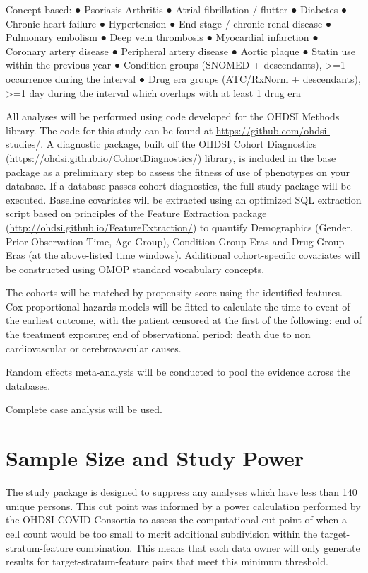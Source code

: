\documentclass[
  12pt,
]{article}
\begin{document}
Concept-based:
● Psoriasis Arthritis
● Atrial fibrillation / flutter
● Diabetes
● Chronic heart failure
● Hypertension
● End stage / chronic renal disease
● Pulmonary embolism
● Deep vein thrombosis
● Myocardial infarction
● Coronary artery disease
● Peripheral artery disease
● Aortic plaque
● Statin use within the previous year
● Condition groups (SNOMED + descendants), \textgreater=1 occurrence during the interval
● Drug era groups (ATC/RxNorm + descendants), \textgreater=1 day during the interval which overlaps with at least 1 drug era

All analyses will be performed using code developed for the OHDSI Methods library. The code for this study can be found at \url{https://github.com/ohdsi-studies/}. A diagnostic package, built off the OHDSI Cohort Diagnostics (\url{https://ohdsi.github.io/CohortDiagnostics/}) library, is included in the base package as a preliminary step to assess the fitness of use of phenotypes on your database. If a database passes cohort diagnostics, the full study package will be executed. Baseline covariates will be extracted using an optimized SQL extraction script based on principles of the Feature Extraction package (\url{http://ohdsi.github.io/FeatureExtraction/}) to quantify Demographics (Gender, Prior Observation Time, Age Group), Condition Group Eras and Drug Group Eras (at the above-listed time windows). Additional cohort-specific covariates will be constructed using OMOP standard vocabulary concepts.

The cohorts will be matched by propensity score using the identified features. Cox proportional hazards models will be fitted to calculate the time-to-event of the earliest outcome, with the patient censored at the first of the following: end of the treatment exposure; end of observational period; death due to non cardiovascular or cerebrovascular causes.

Random effects meta-analysis will be conducted to pool the evidence across the databases.

Complete case analysis will be used.

\hypertarget{sample-size}{%
\section{Sample Size and Study Power}\label{sample-size}}

The study package is designed to suppress any analyses which have less than 140 unique persons. This cut point was informed by a power calculation performed by the OHDSI COVID Consortia to assess the computational cut point of when a cell count would be too small to merit additional subdivision within the target-stratum-feature combination. This means that each data owner will only generate results for target-stratum-feature pairs that meet this minimum threshold.
\end{document}
